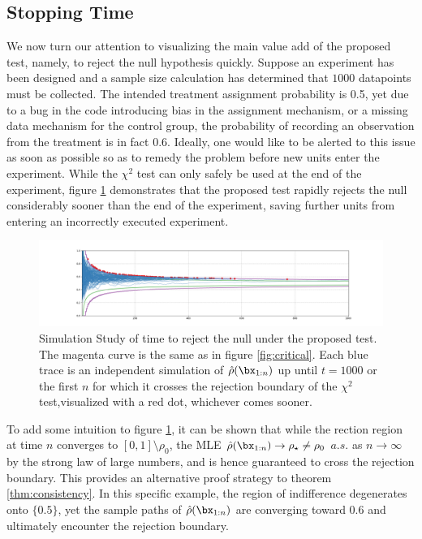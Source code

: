 \documentclass[11pt]{article}
\begin{document}
  \subsection{Stopping Time}
  We now turn our attention to visualizing the main value add of the proposed test, namely, to reject the null hypothesis quickly.
Suppose an experiment has been designed and a sample size calculation has determined that $1000$ datapoints must be collected.
The intended treatment assignment probability is 0.5, yet due to a bug in the code introducing bias in the assignment mechanism, or a missing data mechanism for the control group, the probability of recording an observation from the treatment is in fact 0.6.
Ideally, one would like to be alerted to this issue as soon as possible so as to remedy the problem before new units enter the experiment.
While the $\chi^2$ test can only safely be used at the end of the experiment,
  figure \ref{fig:ssrm_reject} demonstrates that the proposed test rapidly rejects the null considerably sooner than the end of the experiment, saving further units from entering an incorrectly executed experiment.
      \begin{figure}[H]
  \centering
  \includegraphics[scale=0.35]{images/ssrm_reject.png}
  \caption{Simulation Study of time to reject the null under the proposed test.
The magenta curve is the same as in figure \ref{fig:critical}.
Each blue trace is an independent simulation of $\hat{\rho}(\bx_{1:n})$ up until $t=1000$ or the first $n$ for which it crosses the rejection boundary of the $\chi^2$ test,visualized with a red dot, whichever comes sooner.
}
    \label{fig:ssrm_reject}
  \end{figure}
  \noindent To add some intuition to figure \ref{fig:ssrm_reject}, it can be shown that while the rection region at time $n$ converges to $[0,1]\setminus \rho_0$, the MLE $\hat{\rho}(\bx_{1:n}) \rightarrow \rho_\star \neq \rho_0$ $a.s.$ as $n\rightarrow \infty$ by the strong law of large numbers, and is hence guaranteed to cross the rejection boundary.
  This provides an alternative proof strategy to theorem \ref{thm:consistency}.
In this specific example, the region of indifference degenerates onto $\lbrace 0.5 \rbrace$, yet the sample paths of $\hat{\rho}(\bx_{1:n})$ are converging toward 0.6 and ultimately encounter the rejection boundary.
\end{document}
